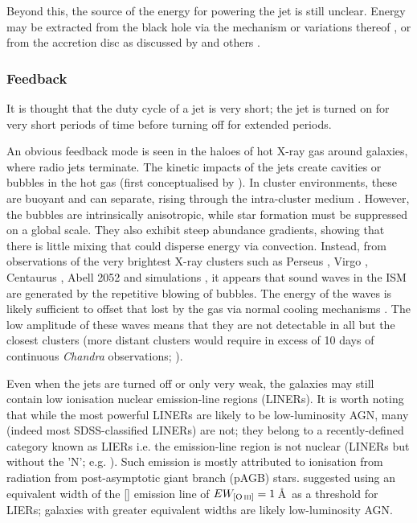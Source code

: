 			Beyond this, the source of the energy for powering the jet is still unclear. Energy may be extracted from the black hole via the \citet{Blandford1977} mechanism or variations thereof \citep[e.g.][]{Koide2002}, or from the accretion disc as discussed by \citet{Blandford1982} and others \citep[e.g.][]{Hujeirat2003}. 

		\subsubsection{Feedback}
			\label{subsubsection:JetFeedback}
			It is thought that the duty cycle of a jet is very short; the jet is turned on for very short periods of time before turning off for extended periods. 

			An obvious feedback mode is seen in the haloes of hot X-ray gas around galaxies, where radio jets terminate. The kinetic impacts of the jets create cavities or bubbles in the hot gas (first conceptualised by \citealt{Gull1973}). In cluster environments, these are buoyant and can separate, rising through the intra-cluster medium \citep[e.g.][]{Churazov2000, Churazov2001, McNamara2000}. However, the bubbles are intrinsically anisotropic, while star formation must be suppressed on a global scale. They also exhibit steep abundance gradients, showing that there is little mixing that could disperse energy via convection. Instead, from observations of the very brightest X-ray clusters such as Perseus \citep{Fabian2003, Fabian2006}, Virgo \citep{Forman2007}, Centaurus \citep{Sanders2008}, Abell 2052 \citep{Blanton2011} and simulations \citep[e.g.][]{Ruszkowski2004, Sijacki2006}, it appears that sound waves in the ISM are generated by the repetitive blowing of bubbles. The energy of the waves is likely sufficient to offset that lost by the gas via normal cooling mechanisms \citep{Fabian2003}. The low amplitude of these waves means that they are not detectable in all but the closest clusters (more distant clusters would require in excess of 10 days of continuous \textit{Chandra} observations; \citealt{Graham2008}).

			Even when the jets are turned off or only very weak, the galaxies may still contain low ionisation nuclear emission-line regions (LINERs). It is worth noting that while the most powerful LINERs are likely to be low-luminosity AGN, many (indeed most SDSS-classified LINERs) are not; they belong to a recently-defined category known as LIERs i.e. the emission-line region is not nuclear (LINERs but without the 'N'; e.g. \citealt{Sarzi2005, Sarzi2010, Singh2013, Belfiore2016a}). Such emission is mostly attributed to ionisation from radiation from post-asymptotic giant branch (pAGB) stars. \citet{Capetti2011} suggested using an equivalent width of the [] emission line of $EW_\text{[\ion{O}{iii}]} = 1$\,\AA\ as a threshold for LIERs; galaxies with greater equivalent widths are likely low-luminosity AGN.

